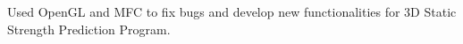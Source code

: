 \begin{miniItemize}
    \item 
    Used OpenGL and MFC to fix bugs and develop new functionalities for 3D Static Strength Prediction Program.
\end{miniItemize}